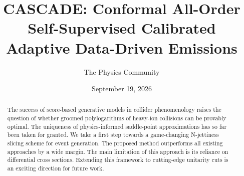 \documentclass[11pt]{article}
\title{CASCADE: Conformal All-Order Self-Supervised Calibrated Adaptive Data-Driven Emissions}
\author{The Physics Community}
\date{September 19, 2026}
\numberwithin{equation}{section}
\theoremstyle{definition}
\theoremstyle{remark}
\begin{document}
\maketitle
\begin{abstract}
The success of score-based generative models in collider phenomenology
raises the question of whether groomed polylogarithms of heavy-ion
collisions can be provably optimal. The uniqueness of physics-informed
saddle-point approximations has so far been taken for granted. We take a
first step towards a game-changing N-jettiness slicing scheme for event
generation. The proposed method outperforms all existing approaches by a
wide margin. The main limitation of this approach is its reliance on
differential cross sections. Extending this framework to cutting-edge
unitarity cuts is an exciting direction for future work.
\end{abstract}
\tableofcontents





\nocite{*}


\end{document}
